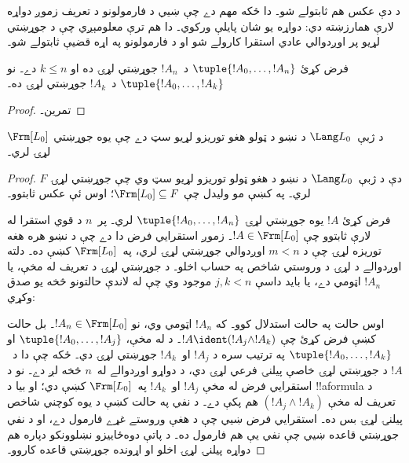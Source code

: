 \documentclass[../../../include/open-logic-section]{subfiles}
\begin{document}
د دې عکس هم ثابتولے شو۔ دا ځکه مهم دے چې ښيي د فارمولونو د تعريف
زموږ دواړه لارې همارزښته دي: دواړه يو شان پايلې ورکوي۔ دا هم ترې
معلومېږي چې د جوړښتي لړيو پر اوږدوالي عادي استقرا کارولے شو او د
فارمولونو په اړه قضيې ثابتولے شو۔

\begin{lem}
فرض کړئ $\tuple{!A_0,\dotsc,!A_n}$ د~$!A_n$ جوړښتي لړۍ ده او
$k \leq n$ دے۔ نو $\tuple{!A_0,\dotsc,!A_k}$ د~$!A_k$ جوړښتي لړۍ
ده۔
\end{lem}

\begin{proof}
تمرين۔
\end{proof}

\begin{thm}
$\Frm[L_0]$ د ژبې~$\Lang L_0$ د نښو د ټولو هغو توريزو لړيو سټ دے
چې يوه جوړښتي لړۍ لري۔
\end{thm}

\begin{proof}
$F$ دې د ژبې~$\Lang L_0$ د نښو د هغو ټولو توريزو لړيو سټ وي چې
جوړښتي لړۍ لري۔ په  کښې مو وليدل
چې $\Frm[L_0] \subseteq F$؛ اوس ئې عکس ثابتوو۔

فرض کړئ $!A$ يوه جوړښتي لړۍ $\tuple{!A_0,\dotsc,!A_n}$ لري۔ پر~$n$
د قوي استقرا له لارې ثابتوو چې $!A \in \Frm[L_0]$۔ زموږ استقرايي
فرض دا دے چې د نښو هره هغه توريزه لړۍ چې د $m < n$ اوږدوالي
جوړښتي لړۍ لري، په~$\Frm[L_0]$ کښې ده۔ دلته اوږدوالے د لړۍ د وروستي شاخص په حساب اخلو۔ د جوړښتي لړۍ د تعريف له مخې،
يا $!A_n$ اټومي دے، يا بايد داسې $j,k < n$ موجود وي چې له لاندې
حالتونو څخه يو صدق وکړي:
\begin{enumerate}
\end{enumerate}
اوس حالت په حالت استدلال کوو۔ که $!A_n$ اټومي وي، نو
$!A_n \in \Frm[L_0]$۔ بل حالت کښې فرض کړئ چې $!A \ident
(!A_j \land !A_k)$۔ د  له مخې،
$\tuple{!A_0,\dotsc,!A_j}$ او $\tuple{!A_0,\dotsc,!A_k}$ په ترتيب
سره د $!A_j$ او~$!A_k$ جوړښتي لړۍ دي۔ ځکه چې دا د~$!A$ د جوړښتي
لړۍ خاصې پيلنۍ فرعي لړۍ دي، د دواړو اوږدوالے له~$n$ څخه لږ دے۔ نو
د استقرايي فرض له مخې $!A_j$ او~$!A_k$ په~$\Frm[L_0]$ کښې دي؛ او
بيا د !!a{formula} د تعريف له مخې $(!A_j \land !A_k)$ هم پکې دے۔
د نفي په حالت کښې د يوه کوچني شاخص پيلنۍ لړۍ بس ده۔
استقرايي فرض ښيي چې د هغې وروستے غړے فارمول دے، او د نفي
جوړښتي قاعده ښيي چې نفي يې هم فارمول ده۔ د پاتې دوه‌ځاييزو
نښلوونکو دپاره هم دواړه پيلنۍ لړۍ اخلو او اړونده
جوړښتي قاعده کاروو۔
\end{proof}
\end{document}
